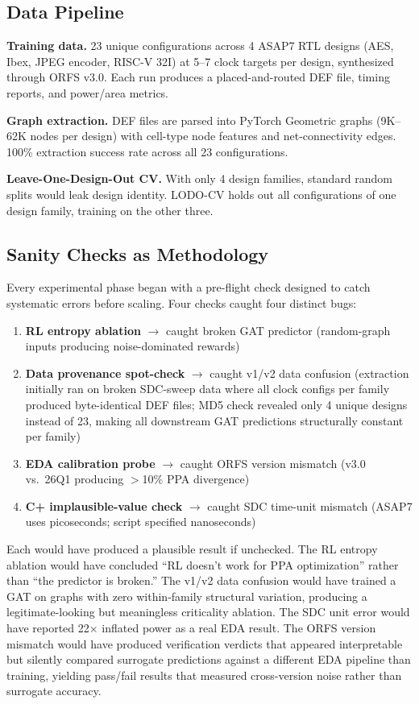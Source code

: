 \documentclass[conference]{IEEEtran}
\begin{document}
\subsection{Data Pipeline}

\textbf{Training data.} 23 unique configurations across 4 ASAP7 RTL designs
(AES, Ibex, JPEG encoder, RISC-V 32I) at 5--7 clock targets per design,
synthesized through ORFS v3.0. Each run produces a placed-and-routed DEF file,
timing reports, and power/area metrics.

\textbf{Graph extraction.} DEF files are parsed into PyTorch Geometric graphs
(9K--62K nodes per design) with cell-type node features and net-connectivity edges.
100\% extraction success rate across all 23 configurations.

\textbf{Leave-One-Design-Out CV.} With only 4 design families, standard random
splits would leak design identity. LODO-CV holds out all configurations of one
design family, training on the other three.

\subsection{Sanity Checks as Methodology}

Every experimental phase began with a pre-flight check designed to catch systematic
errors before scaling. Four checks caught four distinct bugs:

\begin{enumerate}
\item \textbf{RL entropy ablation} $\rightarrow$ caught broken GAT predictor
(random-graph inputs producing noise-dominated rewards)
\item \textbf{Data provenance spot-check} $\rightarrow$ caught v1/v2 data confusion
(extraction initially ran on broken SDC-sweep data where all clock configs per family
produced byte-identical DEF files; MD5 check revealed only 4 unique designs instead of
23, making all downstream GAT predictions structurally constant per family)
\item \textbf{EDA calibration probe} $\rightarrow$ caught ORFS version mismatch
(v3.0 vs.\ 26Q1 producing $>$10\% PPA divergence)
\item \textbf{C+ implausible-value check} $\rightarrow$ caught SDC time-unit
mismatch (ASAP7 uses picoseconds; script specified nanoseconds)
\end{enumerate}

Each would have produced a plausible result if unchecked. The RL entropy ablation
would have concluded ``RL doesn't work for PPA optimization'' rather than ``the
predictor is broken.'' The v1/v2 data confusion would have trained a GAT on
graphs with zero within-family structural variation, producing a legitimate-looking
but meaningless criticality ablation. The SDC unit error would have reported
22$\times$ inflated power as a real EDA result. The ORFS version mismatch would
have produced verification verdicts that appeared interpretable but silently
compared surrogate predictions against a different EDA pipeline than training,
yielding pass/fail results that measured cross-version noise rather than
surrogate accuracy.
\end{document}
